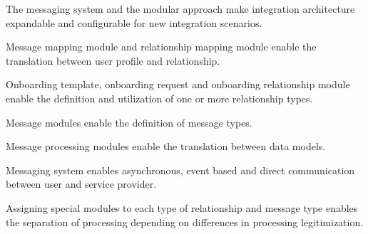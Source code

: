 The messaging system and the modular approach make integration architecture expandable and configurable for new integration scenarios.

Message mapping module and relationship mapping module enable the translation between user profile and relationship.

Onboarding template, onboarding request and onboarding relationship module enable the definition and utilization of one or more relationship types.

Message modules enable the definition of message types.

Message processing modules enable the translation between data models.

Messaging system enables asynchronous, event based and direct communication between user and service provider.

Assigning special modules to each type of relationship and message type enables the separation of processing depending on differences in processing legitimization.
